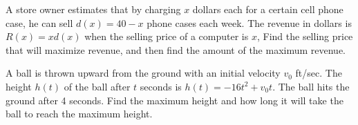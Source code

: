 \newpage

\begin{exercise}
	A store owner estimates that by charging $x$ dollars each for a certain cell phone case, he can sell $d(x)=40 - x$ phone cases each week. The revenue in dollars is $R(x)=xd(x)$ when the selling price of a computer is $x$, Find the selling price that will maximize revenue, and then find the amount of the maximum revenue.
\end{exercise}

\vfill
\begin{center} \hfill
\end{center}

\begin{exercise}
	A ball is thrown upward from the ground with an initial velocity $v_0$ ft/sec. The height $h(t)$ of the ball after $t$ seconds is $h(t)= -16t^2 + v_0t$. The ball hits the ground after 4 seconds.
	Find the maximum height and how long it will take the ball to reach the maximum height.
\end{exercise}

\vfill
\begin{center} \hfill
\end{center}

